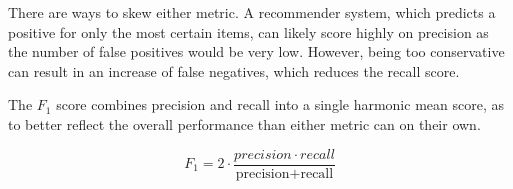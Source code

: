 There are ways to skew either metric. A recommender system, which predicts a positive for only the most certain items, can likely score highly on precision as the number of false positives would be very low. However, being too conservative can result in an increase of false negatives, which reduces the recall score.

The $F_1$ score combines precision and recall into a single harmonic mean score, as to better reflect the overall performance than either metric can on their own.

\begin{equation}
	F_1 = 2 \cdot \frac{precision \cdot recall}{\text{precision} + \text{recall}}
\end{equation}